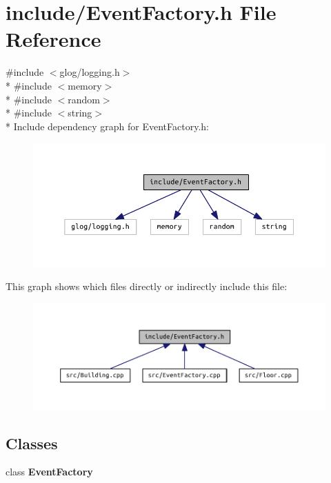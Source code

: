 \section{include/\+Event\+Factory.h File Reference}
\label{_event_factory_8h}
{\ttfamily \#include $<$glog/logging.\+h$>$}\\*
{\ttfamily \#include $<$memory$>$}\\*
{\ttfamily \#include $<$random$>$}\\*
{\ttfamily \#include $<$string$>$}\\*
Include dependency graph for Event\+Factory.\+h\+:\nopagebreak
\begin{figure}[H]
\begin{center}
\leavevmode
\includegraphics[width=318pt]{_event_factory_8h__incl}
\end{center}
\end{figure}
This graph shows which files directly or indirectly include this file\+:\nopagebreak
\begin{figure}[H]
\begin{center}
\leavevmode
\includegraphics[width=350pt]{_event_factory_8h__dep__incl}
\end{center}
\end{figure}
\subsection*{Classes}
\begin{DoxyCompactItemize}
\item 
class {\bf Event\+Factory}
\end{DoxyCompactItemize}
